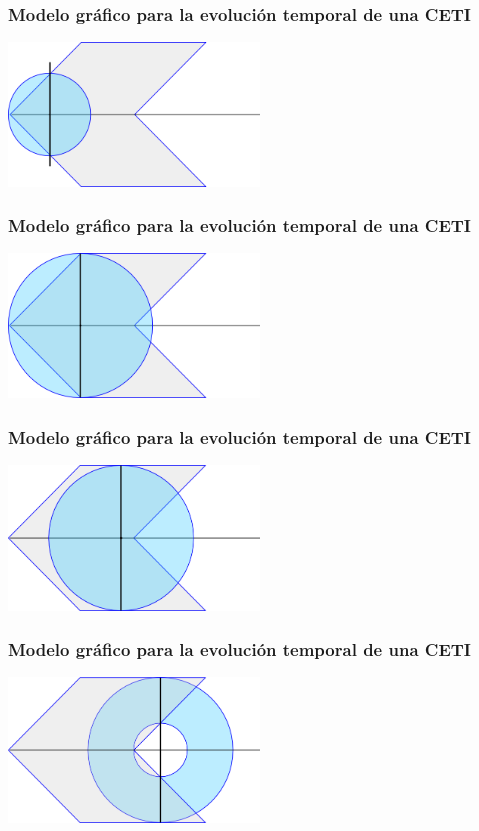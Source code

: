 \documentclass[handout]{beamer}
\theoremstyle{plain}
\theoremstyle{definition}
\theoremstyle{remark}
\begin{document}
\begin{frame}\frametitle{Modelo gráfico para la evolución temporal de
   una CETI}
\centering
\includegraphics[width=0.5\textwidth]{g5090.png}
\end{frame}%

\begin{frame}\frametitle{Modelo gráfico para la evolución temporal de
   una CETI}
\centering
\includegraphics[width=0.5\textwidth]{g5098.png}
\end{frame}%

\begin{frame}\frametitle{Modelo gráfico para la evolución temporal de
   una CETI}
\centering
\includegraphics[width=0.5\textwidth]{g5106.png}
\end{frame}%

\begin{frame}\frametitle{Modelo gráfico para la evolución temporal de
   una CETI}
\centering
\includegraphics[width=0.5\textwidth]{g5114.png}
\end{frame}%
\end{document}
